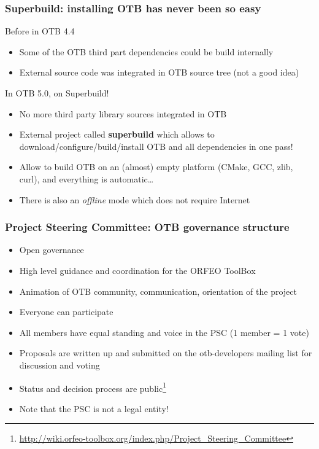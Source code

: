 \documentclass[8pt]{beamer}
\begin{document}
\begin{frame}
\frametitle{Superbuild: installing OTB has never been so easy}
\begin{block}{Before in OTB 4.4}
\begin{itemize}
\item Some of the OTB third part dependencies could be build internally
\item External source code was integrated in OTB source tree (not a good idea)
\end{itemize}
\end{block}

\begin{block}{In OTB 5.0, on Superbuild!}
\begin{itemize}
\item No more third party library sources integrated in OTB
\item External project called \textbf{superbuild} which allows to
  download/configure/build/install OTB and all dependencies in one pass!
\item Allow to build OTB on an (almost) empty platform (CMake, GCC, zlib, curl),
  and everything is automatic\ldots
\item There is also an \textit{offline} mode which does not require Internet
\end{itemize}
\end{block}
\end{frame}

\begin{frame}
\frametitle{Project Steering Committee: OTB governance structure}
\begin{itemize}
\item Open governance
\item High level guidance and coordination for the ORFEO ToolBox
\item Animation of OTB community, communication, orientation of the project
\item Everyone can participate
\item All members have equal standing and voice in the PSC (1 member = 1 vote)
\item Proposals are written up and submitted on the otb-developers mailing list for discussion and voting
\item Status and decision process are
  public\footnote{\url{http://wiki.orfeo-toolbox.org/index.php/Project_Steering_Committee}}
\item Note that the PSC is not a legal entity!
\end{itemize}
\end{frame}
\end{document}
